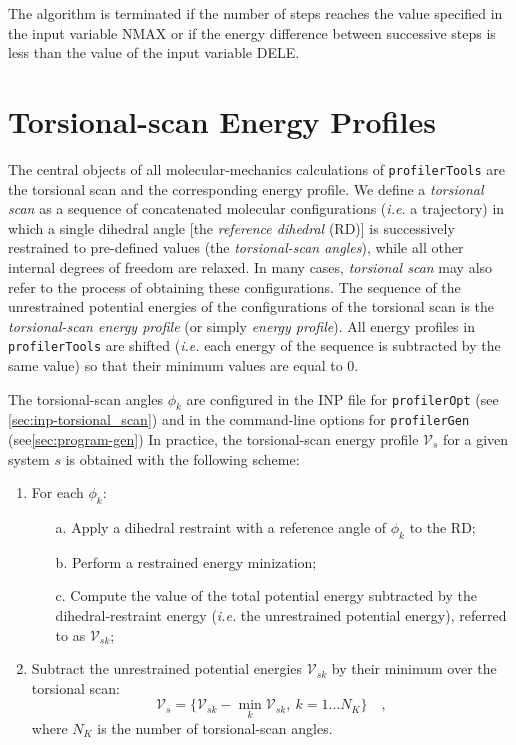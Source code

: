 \documentclass[10pt,a4paper,openany]{memoir}
\numberwithin{equation}{section}
\newcommand{\profileropt}[0]{\texttt{profilerOpt}}
\newcommand{\profilergen}[0]{\texttt{profilerGen}}
\newcommand{\profilertools}[0]{\texttt{profilerTools}}
\begin{document}
The algorithm is terminated if the number of steps reaches the value specified in the input variable NMAX or if the energy difference between successive steps is less than the value of the input variable DELE.

\section{Torsional-scan Energy Profiles}
\label{sec:ga-tpes}

The central objects of all molecular-mechanics calculations of \profilertools{} are the torsional scan and the corresponding energy profile.
%
We define a \textit{torsional scan} as a sequence of concatenated molecular configurations (\textit{i.e.} a trajectory) in which a single dihedral angle [the \textit{reference dihedral} (RD)] is successively restrained to pre-defined values (the \textit{torsional-scan angles}), while all other internal degrees of freedom are relaxed.
In many cases, \textit{torsional scan} may also refer to the process of obtaining these configurations.
The sequence of the unrestrained potential energies of the configurations of the torsional scan is the \textit{torsional-scan energy profile} (or simply \textit{energy profile}).
All energy profiles in \profilertools{} are shifted (\textit{i.e.} each energy of the sequence is subtracted by the same value) so that their minimum values are equal to 0.

The torsional-scan angles $\phi_k$ are configured in the INP file for
\profileropt{} (see \autoref{sec:inp-torsional_scan}) and in the
command-line options for \profilergen{} (see\autoref{sec:program-gen})
In practice, the torsional-scan energy profile $\mathcal{V}_s$ for a
given system $s$ is obtained with the following scheme:
\begin{enumerate}
\item For each $\phi_k$:
  \begin{enumerate}
  \item[a.]  Apply a dihedral restraint with a reference angle of $\phi_k$ to the RD;
  \item [b.] Perform a restrained energy minization;
  \item [c.] Compute the value of the total potential energy
    subtracted by the dihedral-restraint energy (\textit{i.e.} the
    unrestrained potential energy), referred to as $\mathcal{V}_{sk}$;
\end{enumerate}
\item Subtract the unrestrained potential energies
  $\mathcal{V}_{sk}$ by their minimum over the torsional scan:
  \begin{equation}
  \label{eq:ga-tors-scan}
  \mathcal{V}_s = \{ \mathcal{V}_{sk} - \min_k{\mathcal{V}_{sk}},\ k=1\ldots N_K \} \quad ,
\end{equation}
where $N_K$ is the number of torsional-scan angles.
\end{enumerate}
\end{document}
